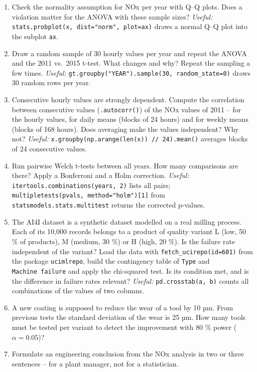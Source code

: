 \documentclass[
  letterpaper,
  DIV=11,
  numbers=noendperiod]{scrreprt}
\providecommand{\tightlist}{%
  \setlength{\itemsep}{0pt}\setlength{\parskip}{0pt}}\usepackage{longtable,booktabs,array}
\begin{document}
\begin{enumerate}
\def\labelenumi{\arabic{enumi}.}
\tightlist
\item
  Check the normality assumption for NOx per year with Q--Q plots. Does
  a violation matter for the ANOVA with these sample sizes?
  \emph{Useful:} \texttt{stats.probplot(x,\ dist="norm",\ plot=ax)}
  draws a normal Q--Q plot into the subplot \texttt{ax}.
\item
  Draw a random sample of 30 hourly values per year and repeat the ANOVA
  and the 2011 vs.~2015 t-test. What changes and why? Repeat the
  sampling a few times. \emph{Useful:}
  \texttt{gt.groupby("YEAR").sample(30,\ random\_state=0)} draws 30
  random rows per year.
\item
  Consecutive hourly values are strongly dependent. Compute the
  correlation between consecutive values (\texttt{.autocorr()}) of the
  NOx values of 2011 -- for the hourly values, for daily means (blocks
  of 24 hours) and for weekly means (blocks of 168 hours). Does
  averaging make the values independent? Why not? \emph{Useful:}
  \texttt{x.groupby(np.arange(len(x))\ //\ 24).mean()} averages blocks
  of 24 consecutive values.
\item
  Run pairwise Welch t-tests between all years. How many comparisons are
  there? Apply a Bonferroni and a Holm correction. \emph{Useful:}
  \texttt{itertools.combinations(years,\ 2)} lists all pairs;
  \texttt{multipletests(pvals,\ method="holm"){[}1{]}} from
  \texttt{statsmodels.stats.multitest} returns the corrected p-values.
\item
  The AI4I dataset is a synthetic dataset modelled on a real milling
  process. Each of its 10,000 records belongs to a product of quality
  variant L (low, 50 \% of products), M (medium, 30 \%) or H (high, 20
  \%). Is the failure rate independent of the variant? Load the data
  with \texttt{fetch\_ucirepo(id=601)} from the package
  \texttt{ucimlrepo}, build the contingency table of \texttt{Type} and
  \texttt{Machine\ failure} and apply the chi-squared test. Is its
  condition met, and is the difference in failure rates relevant?
  \emph{Useful:} \texttt{pd.crosstab(a,\ b)} counts all combinations of
  the values of two columns.
\item
  A new coating is supposed to reduce the wear of a tool by 10 µm. From
  previous tests the standard deviation of the wear is 25 µm. How many
  tools must be tested per variant to detect the improvement with 80 \%
  power (\(\alpha = 0.05\))?
\item
  Formulate an engineering conclusion from the NOx analysis in two or
  three sentences -- for a plant manager, not for a statistician.
\end{enumerate}
\end{document}
